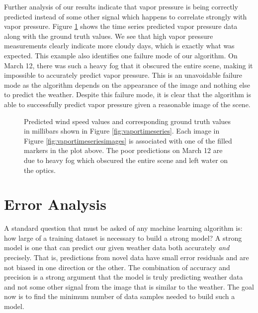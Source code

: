 Further analysis of our results indicate that vapor pressure is being correctly predicted instead of some other signal which happens to correlate strongly with vapor pressure. Figure \ref{fig:vaporpred} shows the time series predicted vapor pressure data along with the ground truth values. We see that high vapor pressure measurements clearly indicate more cloudy days, which is exactly what was expected. This example also identifies one failure mode of our algorithm. On March 12, there was such a heavy fog that it obscured the entire scene, making it impossible to accurately predict vapor pressure. This is an unavoidable failure mode as the algorithm depends on the appearance of the image and nothing else to predict the weather. Despite this failure mode, it is clear that the algorithm is able to successfully predict vapor pressure given a reasonable image of the scene.
\begin{figure}
	\centering
	\caption[Predicted wind speed values and corresponding ground truth values in millibars]{Predicted wind speed values and corresponding ground truth values in millibars shown in Figure \ref{fig:vaportimeseries}. Each image in Figure \ref{fig:vaportimeseriesimages} is associated with one of the filled markers in the plot above. The poor predictions on March 12 are due to heavy fog which obscured the entire scene and left water on the optics.}
	\label{fig:vaporpred}
\end{figure}


\section{Error Analysis}
A standard question that must be asked of any machine learning algorithm is: how large of a training dataset is necessary to build a strong model? A strong model is one that can predict our given weather data both accurately \textit{and} precisely. That is, predictions from novel data have small error residuals and are not biased in one direction or the other. The combination of accuracy and precision is a strong argument that the model is truly predicting weather data and not some other signal from the image that is similar to the weather. The goal now is to find the minimum number of data samples needed to build such a model. 


